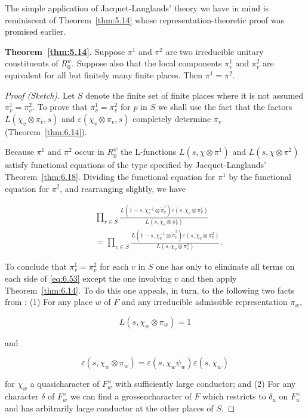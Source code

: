 The simple application of Jacquet-Langlands' theory we have in mind is reminiscent of Theorem~\ref{thm:5.14} whose representation-theoretic proof was promised earlier.

\textbf{Theorem~\ref{thm:5.14}.} Suppose $\pi^1$ and $\pi^2$ are two irreducible unitary constituents of $R_0^{\psi}$. Suppose also that the local components $\pi_v^1$ and $\pi_v^2$ are equivalent for all but finitely many finite places. Then $\pi^1 = \pi^2$.

\begin{proof}[Proof (Sketch)]

Let $S$ denote the finite set of finite places where it is not assumed $\pi_v^1 = \pi_v^2$. To prove that $\pi_v^1 = \pi_v^2$ for $p$ in $S$ we shall use the fact that the factors $L(\chi_v \otimes \pi_v, s)$ and $\varepsilon(\chi_v \otimes \pi_v, s)$ completely determine $\pi_v$ (Theorem~\ref{thm:6.14}).

Because $\pi^1$ and $\pi^2$ occur in $R_0^{\psi}$ the L-functions $L(s, \chi \otimes \pi^1)$ and $L(s, \chi \otimes \pi^2)$ satisfy functional equations of the type specified by Jacquet-Langlands' Theorem~\ref{thm:6.18}. Dividing the functional equation for $\pi^1$ by the functional equation for $\pi^2$, and rearranging slightly, we have

\begin{equation}\label{eq:6.53}
\begin{aligned}
&\prod_{v \in S} \frac{L(1 - s, \chi_v^{-1} \otimes \tilde{\pi}_v^1)\varepsilon(s, \chi_v \otimes \pi_v^1)}{L(s, \chi_v \otimes \pi_v^1)}\\
&= \prod_{v \in S} \frac{L(1 - s, \chi_v^{-1} \otimes \tilde{\pi}_v^2)\varepsilon(s, \chi_v \otimes \pi_v^2)}{L(s, \chi_v \otimes \pi_v^2)}.
\end{aligned}\tag{6.53}
\end{equation}

To conclude that $\pi_v^1 = \pi_v^2$ for each $v$ in $S$ one has only to eliminate all terms on each side of \eqref{eq:6.53} except the one involving $v$ and then apply Theorem~\ref{thm:6.14}. To do this one appeals, in turn, to the following two facts from \cite{JacquetLanglands}: (1) For any place $w$ of $F$ and any irreducible admissible representation $\pi_w$,

\[
L(s, \chi_w \otimes \pi_w) = 1
\]

and

\[
\varepsilon(s, \chi_w \otimes \pi_w) = \varepsilon(s, \chi_w\psi_w)\varepsilon(s, \chi_w)
\]

for $\chi_w$ a quasicharacter of $F_w^{\times}$ with sufficiently large conductor; and (2) For any character $\delta$ of $F_w^{\times}$ we can find a grossencharacter of $F$ which restricts to $\delta_u$ on $F_u^{\times}$ and has arbitrarily large conductor at the other places of $S$.

\end{proof}

